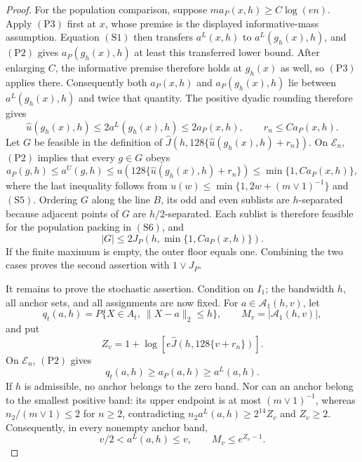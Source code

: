 \documentclass{article}
\begin{document}
\begin{proof}
For the population comparison, suppose \(ma_P(x,h)\geq C\log(en)\).
Apply \((\mathrm{P3})\) first at \(x\), whose premise is the displayed informative-mass assumption.  Equation \((\mathrm{S1})\) then transfers \(a^L(x,h)\) to \(a^L(g_h(x),h)\), and \((\mathrm{P2})\) gives \(a_P(g_h(x),h)\) at least this transferred lower bound.  After enlarging \(C\), the informative premise therefore holds at \(g_h(x)\) as well, so \((\mathrm{P3})\) applies there.  Consequently both \(a_P(x,h)\) and \(a_P(g_h(x),h)\) lie between \(a^L(g_h(x),h)\) and twice that quantity.  The positive dyadic rounding
therefore gives
\[
 \widehat u(g_h(x),h)\leq2a^L(g_h(x),h)\leq2a_P(x,h),
 \qquad r_n\leq C a_P(x,h).                                      \tag{S5}
\]
Let \(G\) be feasible in the definition of
\(\widehat J(h,128\{\widehat u(g_h(x),h)+r_n\})\).
On \(\mathcal E_n\), \((\mathrm{P2})\) implies that every \(g\in G\) obeys
\[
 a_P(g,h)\leq a^U(g,h)
 \leq u\!\left(128\{\widehat u(g_h(x),h)+r_n\}\right)
 \leq\min\{1,Ca_P(x,h)\},                                        \tag{S6}
\]
where the last inequality follows from
\(u(w)\leq\min\{1,2w+(m\vee1)^{-1}\}\) and \((\mathrm{S5})\).
Ordering \(G\) along the line \(B\), its odd and even sublists are
\(h\)-separated because adjacent points of \(G\) are \(h/2\)-separated.
Each sublist is therefore feasible for the population packing in
\((\mathrm{S6})\), and
\[
 |G|\leq2J_P\!\left(h,\min\{1,Ca_P(x,h)\}\right).
\]
If the finite maximum is empty, the outer floor equals one.  Combining the
two cases proves the second assertion with \(1\vee J_P\).

It remains to prove the stochastic assertion.  Condition on \(I_1\); the
bandwidth \(h\), all anchor sets, and all assignments are now fixed.
For \(a\in\mathcal A_1(h,v)\), let
\[
 q_t(a,h)=P\{X\in A_t,\ \|X-a\|_2\leq h\},
 \qquad
 M_v=|\mathcal A_1(h,v)|,
\]
and put
\[
 Z_v=1+\log\!\left[
 e\widehat J\!\left(h,128\{v+r_n\}\right)\right].
\]
On \(\mathcal E_n\), \((\mathrm{P2})\) gives
\[
 q_t(a,h)\geq a_P(a,h)\geq a^L(a,h).                             \tag{S7}
\]
If \(h\) is admissible, no anchor belongs to the zero band.  Nor can an
anchor belong to the smallest positive band: its upper endpoint is at most
\((m\vee1)^{-1}\), whereas \(n_2/(m\vee1)\leq2\) for \(n\geq2\), contradicting
\(n_2a^L(a,h)\geq2^{14}Z_v\) and \(Z_v\geq2\).
Consequently, in every nonempty anchor band,
\[
 v/2<a^L(a,h)\leq v,\qquad M_v\leq e^{Z_v-1}.                    \tag{S8}
\]


\end{proof}
\end{document}
